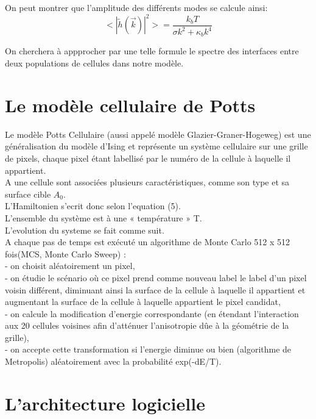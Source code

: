 \documentclass[11pt,a4paper]{article}
\begin{document}
On peut montrer que l'amplitude des différents modes se calcule ainsi:
\begin{equation}
<|\tilde{h}(\overrightarrow{k})|^{2}> = \frac{k_bT}{\sigma k^{2} + \kappa_b k^{4}}
\end{equation}

On cherchera à appprocher par une telle formule le spectre des interfaces entre deux populations de cellules dans notre modèle.

\section{Le modèle cellulaire de Potts}


Le modèle Potts Cellulaire (aussi appelé modèle Glazier-Graner-Hogeweg) est une généralisation du modèle d'Ising et représente un système cellulaire sur une grille de pixels, chaque pixel étant labellisé par le numéro de la cellule à laquelle il appartient.\\

A une cellule sont associées plusieurs caractéristiques, comme son type et sa surface cible $A_0$.\\

L’Hamiltonien s’ecrit donc selon l'equation (5).\\

L’ensemble du système est à une « température » T.\\

L’evolution du systeme se fait comme suit.\\
A chaque pas de temps est exécuté un algorithme de Monte Carlo 512 x 512 fois(MCS, Monte Carlo Sweep) : \\
- on choisit aléatoirement un pixel,\\
- on étudie le scénario où ce pixel prend comme nouveau label le label d’un pixel voisin différent, diminuant ainsi la surface de la cellule à laquelle il appartient et augmentant la surface de la cellule à laquelle appartient le pixel candidat,\\
- on calcule la modification d’energie correspondante (en étendant l'interaction aux 20 cellules voisines afin d'atténuer l'anisotropie dûe à la géométrie de la grille),\\
- on accepte cette transformation si l’energie diminue ou bien (algorithme de Metropolis) aléatoirement avec la probabilité exp(-dE/T).\\

           

\section{L’architecture logicielle}
\end{document}
